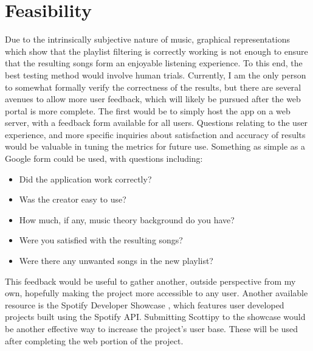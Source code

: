 \section{Feasibility}
Due to the intrinsically subjective nature of music, graphical representations
which show that the playlist filtering is correctly working is not enough to
ensure that the resulting songs form an enjoyable listening experience. To this
end, the best testing method would involve human trials. Currently, I am the
only person to somewhat formally verify the correctness of the results, but
there are several avenues to allow more user feedback, which will likely be
pursued after the web portal is more complete. The first would be to simply
host the app on a web server, with a feedback form available for all users.
Questions relating to the user experience, and more specific inquiries about
satisfaction and accuracy of results would be valuable in tuning the metrics
for future use. Something as simple as a Google form could be used, with
questions including:
\begin{itemize}
  \item Did the application work correctly?
  \item Was the creator easy to use?
  \item How much, if any, music theory background do you have?
  \item Were you satisfied with the resulting songs?
  \item Were there any unwanted songs in the new playlist?
\end{itemize}
This feedback would be useful to gather another, outside perspective from my
own, hopefully making the project more accessible to any user.
Another available resource is the Spotify Developer Showcase
\cite{Spotify:19}, which features user developed projects built using the
Spotify API. Submitting Scottipy to the showcase would be another effective
way to increase the project's user base. These will be used after completing
the web portion of the project.

